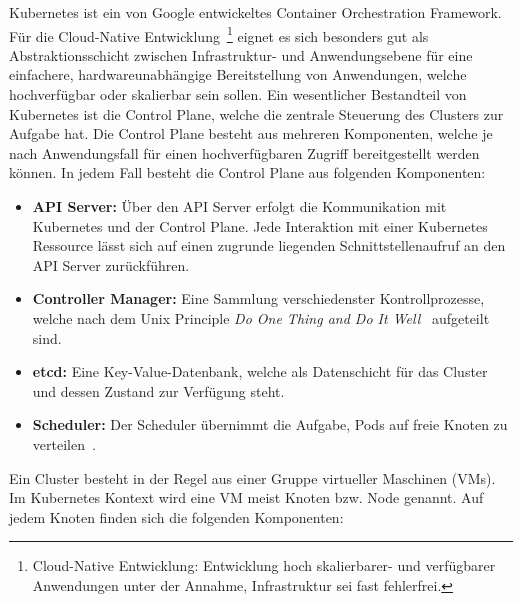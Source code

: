 Kubernetes ist ein von Google entwickeltes Container Orchestration Framework.
Für die Cloud-Native Entwicklung~\footnote{Cloud-Native Entwicklung: Entwicklung hoch skalierbarer- und verfügbarer Anwendungen unter der Annahme, Infrastruktur sei fast fehlerfrei\cite{8125550}.} eignet es sich besonders gut als Abstraktionsschicht zwischen Infrastruktur- und Anwendungsebene für eine einfachere, hardwareunabhängige Bereitstellung von Anwendungen, welche hochverfügbar oder skalierbar sein sollen.
Ein wesentlicher Bestandteil von Kubernetes ist die Control Plane, welche die zentrale Steuerung des Clusters zur Aufgabe hat.
Die Control Plane besteht aus mehreren Komponenten, welche je nach Anwendungsfall für einen hochverfügbaren Zugriff bereitgestellt werden können.
In jedem Fall besteht die Control Plane aus folgenden Komponenten:
\begin{itemize}
    \item \textbf{API Server:} Über den API Server erfolgt die Kommunikation mit Kubernetes und der Control Plane.
    Jede Interaktion mit einer Kubernetes Ressource lässt sich auf einen zugrunde liegenden Schnittstellenaufruf an den API Server zurückführen.
    \item \textbf{Controller Manager:} Eine Sammlung verschiedenster Kontrollprozesse, welche nach dem Unix Principle \emph{Do One Thing and Do It Well}~\cite{gancarz2003linux} aufgeteilt sind.
    \item \textbf{etcd:} Eine Key-Value-Datenbank, welche als Datenschicht für das Cluster und dessen Zustand zur Verfügung steht.
    \item \textbf{Scheduler:} Der Scheduler übernimmt die Aufgabe, Pods auf freie Knoten zu verteilen~\cite{kubernetesscheduler}.
\end{itemize}

Ein Cluster besteht in der Regel aus einer Gruppe virtueller Maschinen (VMs).
Im Kubernetes Kontext wird eine VM meist Knoten bzw. Node genannt.
Auf jedem Knoten finden sich die folgenden Komponenten:

